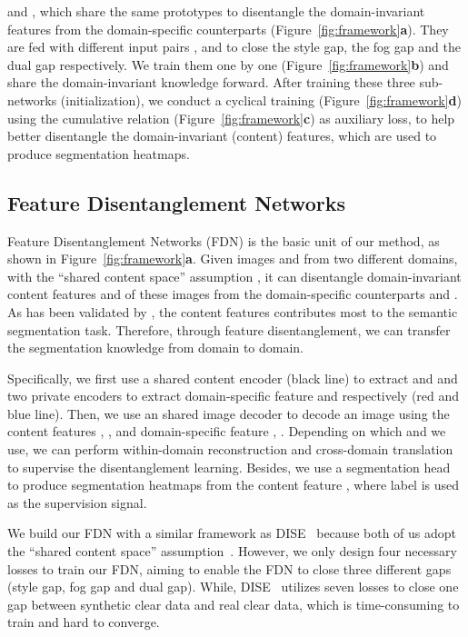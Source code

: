 \documentclass[10pt,twocolumn,letterpaper]{article}
\begin{document}
and , 
which share the same prototypes to disentangle the domain-invariant features from the domain-specific counterparts (Figure~\ref{fig:framework}\textbf{a}).
They are fed with different input pairs ,  and  to close the style gap, the fog gap and the dual gap respectively.
We train them one by one (Figure~\ref{fig:framework}\textbf{b}) and share the domain-invariant knowledge forward. After training these three sub-networks (initialization), we conduct a cyclical training (Figure~\ref{fig:framework}\textbf{d}) using the cumulative relation (Figure~\ref{fig:framework}\textbf{c}) as auxiliary loss, to help better disentangle the domain-invariant (content) features, which are used to produce segmentation heatmaps.


\subsection{Feature Disentanglement Networks}
\label{sec:FDN}

Feature Disentanglement Networks (FDN) is the basic unit of our method, as shown in Figure~\ref{fig:framework}\textbf{a}. 
Given images  and  from two different domains, with the ``shared content space'' assumption \cite{huang2018multimodal}, it can disentangle domain-invariant content features  and  of these images from the domain-specific counterparts  and . As has been validated by \cite{chang2019all}, the content features contributes most to the semantic segmentation task. Therefore, through feature disentanglement, we can transfer the segmentation knowledge from  domain to  domain. 

Specifically, we first use a shared content encoder  (black line) to extract  and  and two private encoders to extract domain-specific feature  and  respectively (red and blue line). Then, we use an shared image decoder  to decode an image using the content features , , and domain-specific feature , . Depending on which  and  we use, we can perform within-domain reconstruction and cross-domain translation to supervise the disentanglement learning. Besides, we use a segmentation head  to produce segmentation heatmaps  from the content feature , where label  is used as the supervision signal.

We build our FDN with a similar framework as DISE~\cite{chang2019all} because  both of us adopt the ``shared content space'' assumption~\cite{huang2018multimodal}. However, we only design four necessary losses to train our FDN, aiming to enable the FDN to close three different gaps (style gap, fog gap and dual gap). While, DISE~\cite{chang2019all} utilizes seven losses to close one gap between synthetic clear data and real clear data, which is time-consuming to train and hard to converge.
\end{document}
